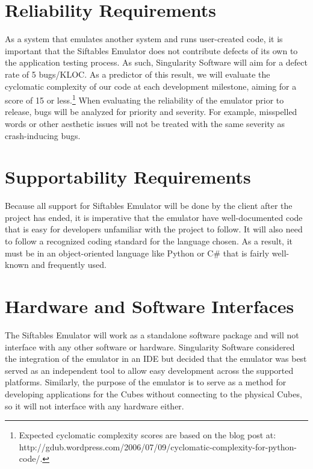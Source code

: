 \documentclass[12pt]{article}
\begin{document}
\section{Reliability Requirements}
As a system that emulates another system and runs user-created code, it is important that the Siftables Emulator does not contribute defects of its own to the application testing process. As such, Singularity Software will aim for a defect rate of 5 bugs/KLOC. As a predictor of this result, we will evaluate the cyclomatic complexity of our code at each development milestone, aiming for a score of 15 or less.\footnote{Expected cyclomatic complexity scores are based on the blog post at: http://gdub.wordpress.com/2006/07/09/cyclomatic-complexity-for-python-code/.} When evaluating the reliability of the emulator prior to release, bugs will be analyzed for priority and severity. For example, misspelled words or other aesthetic issues will not be treated with the same severity as crash-inducing bugs.

\section{Supportability Requirements}
Because all support for Siftables Emulator will be done by the client after the project has ended, it is imperative that the emulator have well-documented code that is easy for developers unfamiliar with the project to follow. It will also need to follow a recognized coding standard for the language chosen. As a result, it must be in an object-oriented language like Python or C\# that is fairly well-known and frequently used.

\section{Hardware and Software Interfaces}
The Siftables Emulator will work as a standalone software package and will not interface with any other software or hardware. Singularity Software considered the integration of the emulator in an \gls{IDE} but decided that the emulator was best served as an independent tool to allow easy development across the supported platforms. Similarly, the purpose of the emulator is to serve as a method for developing applications for the Cubes without connecting to the physical Cubes, so it will not interface with any hardware either.
\end{document}
